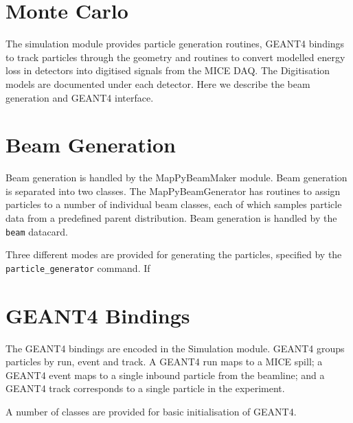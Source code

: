 \section{Monte Carlo}
The simulation module provides particle generation routines, GEANT4 bindings to track particles through the geometry and routines to convert modelled energy loss in detectors into digitised signals from the MICE DAQ. The Digitisation models are documented under each detector. Here we describe the beam generation and GEANT4 interface.

\section{Beam Generation}
Beam generation is handled by the MapPyBeamMaker module. Beam generation is separated into two classes. The MapPyBeamGenerator has routines to assign particles to a number of individual beam classes, each of which samples particle data from a predefined parent distribution. Beam generation is handled by the \verb|beam| datacard.

Three different modes are provided for generating the particles, specified by the \verb|particle_generator| command. If 

\section{GEANT4 Bindings}
The GEANT4 bindings are encoded in the Simulation module. GEANT4 groups particles by run, event and track. A GEANT4 run maps to a MICE spill; a GEANT4 event maps to a single inbound particle from the beamline; and a GEANT4 track corresponds to a single particle in the experiment.

A number of classes are provided for basic initialisation of GEANT4.

